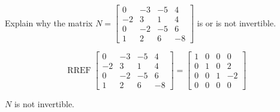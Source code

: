 
\begin{exerciseStatement}


Explain why the matrix \(N= \left[\begin{array}{cccc}
0 & -3 & -5 & 4 \\
-2 & 3 & 1 & 4 \\
0 & -2 & -5 & 6 \\
1 & 2 & 6 & -8
\end{array}\right] \) is or is not invertible.


\end{exerciseStatement}
    
\begin{exerciseAnswer} 


\[\operatorname{RREF} \left[\begin{array}{cccc}
0 & -3 & -5 & 4 \\
-2 & 3 & 1 & 4 \\
0 & -2 & -5 & 6 \\
1 & 2 & 6 & -8
\end{array}\right] = \left[\begin{array}{cccc}
1 & 0 & 0 & 0 \\
0 & 1 & 0 & 2 \\
0 & 0 & 1 & -2 \\
0 & 0 & 0 & 0
\end{array}\right] \]

\(N\) is not invertible.
\end{exerciseAnswer}
    
